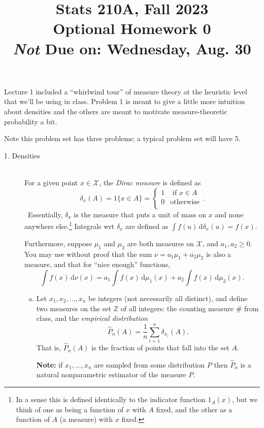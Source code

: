 \documentclass{article}
\title{Stats 210A, Fall 2023\\
  {\bf Optional} Homework 0\\
  {\large {\bf {\em Not} Due on}: Wednesday, Aug. 30}}
\date{}
\newcommand{\cX}{\mathcal{X}}
\newcommand{\ZZ}{\mathbb{Z}}
\newcommand{\td}{\,\textrm{d}}
\newcommand{\red}{\color{red}}
\newcommand{\blue}{\color{blue}}
\begin{document}
\maketitle

Lecture 1 included a ``whirlwind tour'' of measure theory at the heuristic level that we'll be using in class. Problem 1 is meant to give a little more intuition about densities and the others are meant to motivate measure-theoretic probability a bit.

Note this problem set has three problems; a typical problem set will have 5.



\begin{description}

\item[1. Densities]\hfill\\

For a given point $x \in \cX$, the {\em Dirac measure} is defined as 
\[
\delta_x(A) = 1\{x \in A\} = \begin{cases} 1 & \text{ if } x \in A\\ 0 & \text{otherwise}\\ \end{cases}.
\]
\
Essentially, $\delta_x$ is the measure that puts a unit of mass on $x$ and none anywhere else.\footnote{In a sense this is defined identically to the indicator function $1_A(x)$, but we think of one as being a function of $x$ with $A$ fixed, and the other as a function of $A$ (a measure) with $x$ fixed.} Integrals wrt $\delta_x$ are defined as $\int f(u) \td\delta_x(u) = f(x)$.

 Furthermore, suppose $\mu_1$ and $\mu_2$ are both measures on $\cX$, and $a_1,a_2 \geq 0$. You may use without proof that the sum $\nu = a_1\mu_1 + a_2\mu_2$ is also a measure, and that for ``nice enough'' functions,
\[
\int f(x)\td \nu(x) = a_1\int f(x)\td \mu_1(x) + a_2\int f(x)\td \mu_2(x).
\]

\begin{enumerate}[(a)]
\item Let $x_1,x_2,\ldots, x_n$ be integers (not necessarily all distinct), and define two measures on the set $\ZZ$ of all integers: the counting measure $\#$ from class, and the {\em empirical distribution}
\[
\widehat{P}_n(A) = \frac{1}{n}\sum_{i=1}^n \delta_{x_i}(A).
\]
That is, $\widehat{P}_n(A)$ is the fraction of points that fall into the set $A$.

{\bf Note:} if $x_1,\ldots, x_n$ are sampled from some distribution $P$ then $\widehat{P}_n$ is a natural nonparametric estimator of the measure $P$.


\end{enumerate}
\end{description}
\end{document}
